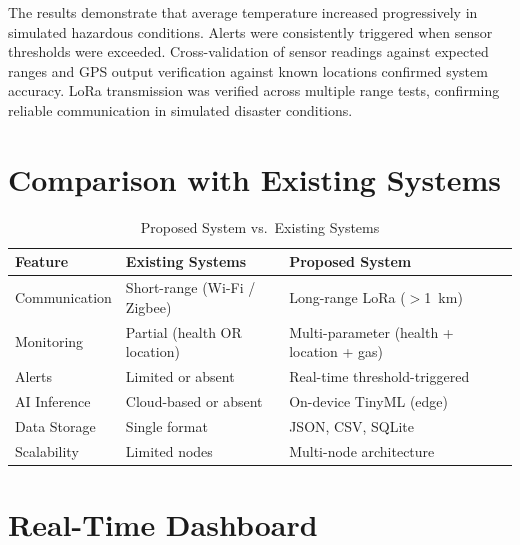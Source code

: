 \documentclass[conference]{IEEEtran}
\begin{document}
	The results demonstrate that average temperature increased progressively in
	simulated hazardous conditions. Alerts were consistently triggered when sensor
	thresholds were exceeded. Cross-validation of sensor readings against expected
	ranges and GPS output verification against known locations confirmed system
	accuracy. LoRa transmission was verified across multiple range tests, confirming
	reliable communication in simulated disaster conditions.
	
	\section{Comparison with Existing Systems}
	
	\begin{table}[h]
		\caption{Proposed System vs.\ Existing Systems}
		\label{tab:comparison}
		\centering
		\renewcommand{\arraystretch}{1.2}
		\begin{tabular}{|p{1.8cm}|p{2.6cm}|p{2.6cm}|}
			\hline
			\textbf{Feature} & \textbf{Existing Systems} & \textbf{Proposed System} \\
			\hline
			Communication  & Short-range (Wi-Fi / Zigbee) & Long-range LoRa ($>$1~km) \\
			\hline
			Monitoring     & Partial (health OR location) & Multi-parameter (health + location + gas) \\
			\hline
			Alerts         & Limited or absent            & Real-time threshold-triggered \\
			\hline
			AI Inference   & Cloud-based or absent        & On-device TinyML (edge) \\
			\hline
			Data Storage   & Single format                & JSON, CSV, SQLite \\
			\hline
			Scalability    & Limited nodes                & Multi-node architecture \\
			\hline
		\end{tabular}
	\end{table}
	
	\section{Real-Time Dashboard}
	
\end{document}
